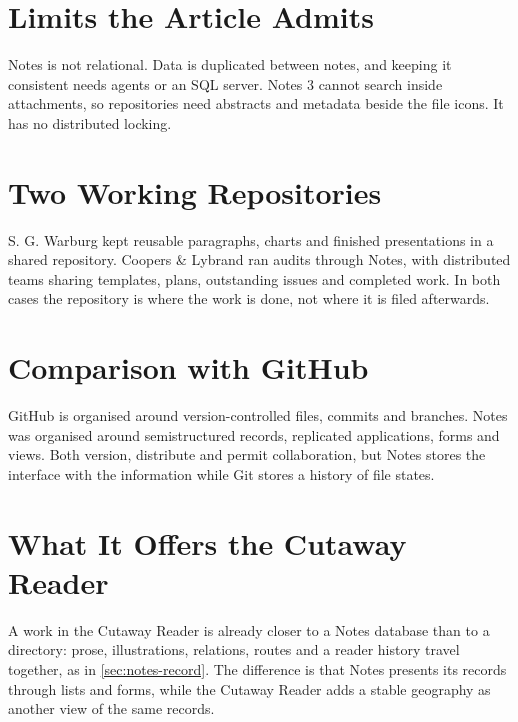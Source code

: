 \documentclass{article}
\begin{document}
\section{Limits the Article Admits}\label{sec:notes-limits}
Notes is not relational. Data is duplicated between notes, and keeping it consistent needs agents or an SQL server. Notes 3 cannot search inside attachments, so repositories need abstracts and metadata beside the file icons. It has no distributed locking.
\section{Two Working Repositories}\label{sec:notes-cases}
S. G. Warburg kept reusable paragraphs, charts and finished presentations in a shared repository. Coopers \& Lybrand ran audits through Notes, with distributed teams sharing templates, plans, outstanding issues and completed work. In both cases the repository is where the work is done, not where it is filed afterwards.
\section{Comparison with GitHub}\label{sec:notes-github}
GitHub is organised around version-controlled files, commits and branches. Notes was organised around semistructured records, replicated applications, forms and views. Both version, distribute and permit collaboration, but Notes stores the interface with the information while Git stores a history of file states.
\section{What It Offers the Cutaway Reader}\label{sec:notes-cutaway}
A work in the Cutaway Reader is already closer to a Notes database than to a directory: prose, illustrations, relations, routes and a reader history travel together, as in \ref{sec:notes-record}. The difference is that Notes presents its records through lists and forms, while the Cutaway Reader adds a stable geography as another view of the same records.
\end{document}
